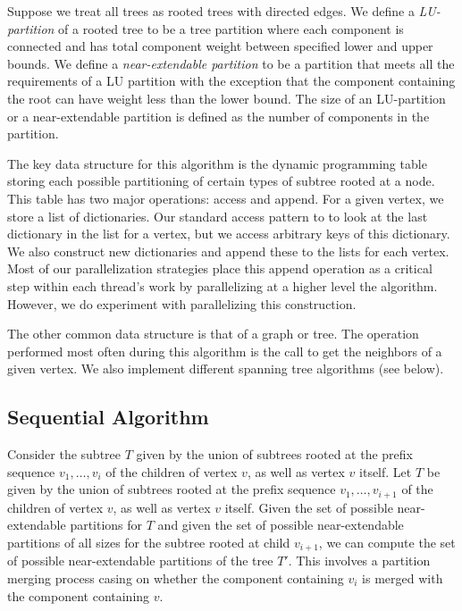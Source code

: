 \documentclass[11pt]{article}
\begin{document}
Suppose we treat all trees as rooted trees with directed edges.
We define a \textit{LU-partition} of a rooted tree to be a tree partition where each component is connected and has total component weight between specified lower and upper bounds.
We define a \textit{near-extendable partition} to be a partition that meets all the requirements of a LU partition with the exception that the component containing the root can have weight less than the lower bound.
The size of an LU-partition or a near-extendable partition is defined as the number of components in the partition.

The key data structure for this algorithm is the dynamic programming table storing each possible partitioning of certain types of subtree rooted at a node.
This table has two major operations: access and append.
For a given vertex, we store a list of dictionaries. 
Our standard access pattern to to look at the last dictionary in the list for a vertex, but we access arbitrary keys of this dictionary.
We also construct new dictionaries and append these to the lists for each vertex.
Most of our parallelization strategies place this append operation as a critical step within each thread's work by parallelizing at a higher level the algorithm.
However, we do experiment with parallelizing this construction.

The other common data structure is that of a graph or tree.
The operation performed most often during this algorithm is the call to get the neighbors of a given vertex.
We also implement different spanning tree algorithms (see below).

\subsection{Sequential Algorithm}
Consider the subtree $T$ given by the union of subtrees rooted at the prefix sequence $v_1, \dots, v_i$ of the children of vertex $v$, as well as vertex $v$ itself.
Let $T$ be given by the union of subtrees rooted at the prefix sequence $v_1, \dots, v_{i+1}$ of the children of vertex $v$, as well as vertex $v$ itself.
Given the set of possible near-extendable partitions for $T$ and given the set of possible near-extendable partitions of all sizes for the subtree rooted at child $v_{i+1}$, we can compute the set of possible near-extendable partitions of the tree $T'$.
This involves a partition merging process casing on whether the component containing $v_i$ is merged with the component containing $v$.
\end{document}
